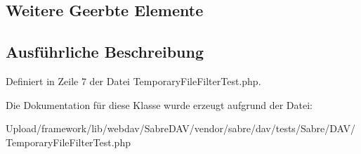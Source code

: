 \subsection*{Weitere Geerbte Elemente}


\subsection{Ausführliche Beschreibung}


Definiert in Zeile 7 der Datei Temporary\+File\+Filter\+Test.\+php.



Die Dokumentation für diese Klasse wurde erzeugt aufgrund der Datei\+:\begin{DoxyCompactItemize}
\item 
Upload/framework/lib/webdav/\+Sabre\+D\+A\+V/vendor/sabre/dav/tests/\+Sabre/\+D\+A\+V/Temporary\+File\+Filter\+Test.\+php\end{DoxyCompactItemize}
